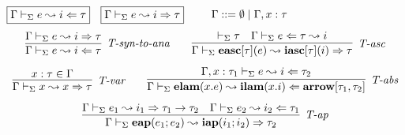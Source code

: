 \begin{figure}
\vspace{-10px}
$\fbox{$\Gamma \vdash_\Sigma e \leadsto i \Leftarrow \tau$}$~
$\fbox{$\Gamma \vdash_\Sigma e \leadsto i \Rightarrow \tau$}$~~~~
$\Gamma ::= \emptyset \mathrel{\mid} \Gamma, x : \tau$
\[
\begin{array}{c}
\infer[\textit{T-syn-to-ana}]
	{\Gamma \vdash_\Sigma  e \leadsto i\Leftarrow \tau } 
	{\Gamma \vdash_\Sigma e  \leadsto i\Rightarrow \tau  }
~~~~~~
\infer[\textit{T-asc}]
	{\Gamma  \vdash_\Sigma \keyw{easc}[\tau](e) \leadsto \keyw{iasc}[\tau](i) \Rightarrow \tau}
	{\vdash_\Sigma \tau & \Gamma \vdash_\Sigma e \Leftarrow \tau \leadsto i } \\[2ex]

\infer[\textit{T-var}]
	{\Gamma \vdash_\Sigma x \leadsto x \Rightarrow\tau } 
	{x:\tau \in \Gamma }
~~~~~~
\infer[\textit{T-abs}]
	{\Gamma \vdash_\Sigma  \keyw{elam}(x . e) \leadsto \keyw{ilam}(x .i) \Leftarrow \keyw{arrow}[\tau_1, \tau_2]} 
	{\Gamma, x:\tau_1 \vdash_\Sigma e\leadsto i\Leftarrow \tau_2 }\\[2ex]

\infer[\textit{T-ap}]
	{\Gamma \vdash_\Sigma  \keyw{eap}(e_1; e_2) \leadsto \keyw{iap}(i_1; i_2) \Rightarrow \tau_2  } 
	{\Gamma \vdash_\Sigma e_1 \leadsto i_1 \Rightarrow \tau_1 \rightarrow \tau_2    & \Gamma \vdash_\Sigma e_2  \leadsto i_2 \Leftarrow \tau_1}\\[2ex]


\end{array}\]
\end{figure}
